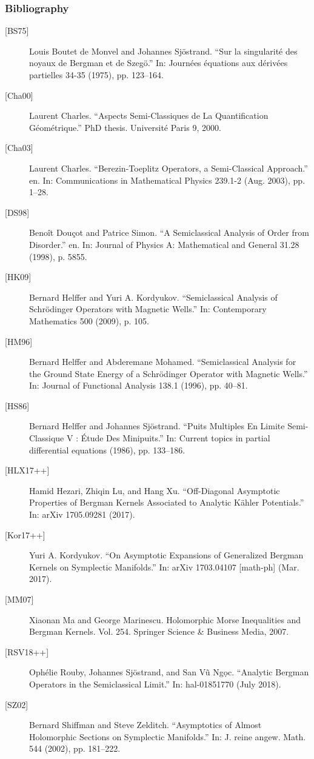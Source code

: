 \documentclass[mathserif]{beamer}
\begin{document}
  \begin{frame}[allowframebreaks]
    \frametitle{Bibliography}
        {\footnotesize
          \begin{description}
            \item[{[BS75]}] Louis Boutet de Monvel and Johannes
              Sjöstrand.  “Sur la singularité des noyaux de Bergman et
              de Szegö.” In: Journées équations aux dérivées
              partielles 34-35 (1975), pp. 123--164.
        \item[{[Cha00]}] Laurent Charles. “Aspects Semi-Classiques de La Quantification Géométrique.” PhD thesis. Université Paris 9, 2000.
        \item[{[Cha03]}] Laurent Charles. “Berezin-Toeplitz Operators, a Semi-Classical Approach.” en. In: Communications in Mathematical Physics 239.1-2
(Aug. 2003), pp. 1–28.
        \item[{[DS98]}] Benoît Douçot and Patrice Simon. “A Semiclassical Analysis of Order
from Disorder.” en. In: Journal of Physics A: Mathematical and General
31.28 (1998), p. 5855.
\item[{[HK09]}] Bernard Helffer and Yuri A. Kordyukov. “Semiclassical Analysis of
Schrödinger Operators with Magnetic Wells.” In: Contemporary Mathematics 500 (2009), p. 105.
\item[{[HM96]}] Bernard Helffer and Abderemane Mohamed. “Semiclassical Analysis for
the Ground State Energy of a Schrödinger Operator with Magnetic
Wells.” In: Journal of Functional Analysis 138.1 (1996), pp. 40–81.
\item[{[HS86]}] Bernard Helffer and Johannes Sjöstrand. “Puits Multiples En Limite
Semi-Classique V : Étude Des Minipuits.” In: Current topics in partial
differential equations (1986), pp. 133–186.
\item[{[HLX17++]}] Hamid Hezari, Zhiqin Lu, and Hang Xu. “Off-Diagonal Asymptotic
Properties of Bergman Kernels Associated to Analytic Kähler Potentials.” In: arXiv 1705.09281 (2017).
\item[{[Kor17++]}] Yuri A. Kordyukov. “On Asymptotic Expansions of Generalized Bergman
Kernels on Symplectic Manifolds.” In: arXiv 1703.04107 [math-ph]
(Mar. 2017).
\item[{[MM07]}] Xiaonan Ma and George Marinescu. Holomorphic Morse Inequalities
and Bergman Kernels. Vol. 254. Springer Science \& Business Media,
2007.
\item[{[RSV18++]}] Ophélie Rouby, Johannes Sjöstrand, and San Vũ Ng\d{o}c. “Analytic
Bergman Operators in the Semiclassical Limit.” In: hal-01851770 (July
2018).
\item[{[SZ02]}] Bernard Shiffman and Steve Zelditch. “Asymptotics of Almost Holomorphic Sections on Symplectic Manifolds.” In: J. reine angew. Math.
544 (2002), pp. 181–222.
        \end{description}
        }
      \end{frame}
\end{document}
